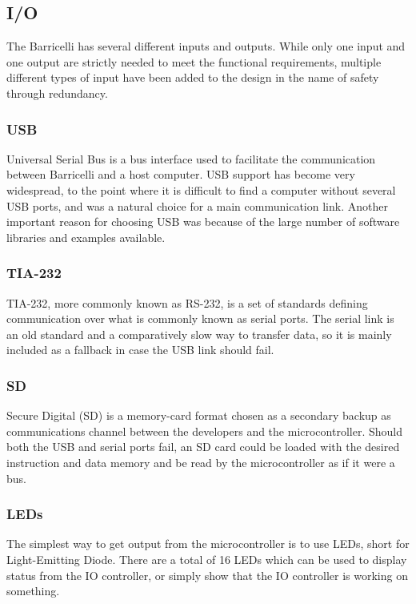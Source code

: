 \subsection{I/O}

The Barricelli has several different inputs and outputs.
While only one input and one output are strictly needed to meet the functional requirements, multiple different types of input have been added to the design in the name of safety through redundancy.

\subsubsection{USB}

Universal Serial Bus is a bus interface used to facilitate the communication between Barricelli and a host computer.
USB support has become very widespread, to the point where it is difficult to find a computer without several USB ports, and was a natural choice for a main communication link.
Another important reason for choosing USB was because of the large number of software libraries and examples available.

\subsubsection{TIA-232}

TIA-232, more commonly known as RS-232, is a set of standards defining communication over what is commonly known as serial ports.
The serial link is an old standard and a comparatively slow way to transfer data, so it is mainly included as a fallback in case the USB link should fail.

\subsubsection{SD}

Secure Digital (SD) is a memory-card format chosen as a secondary backup as communications channel between the developers and the microcontroller.
Should both the USB and serial ports fail, an SD card could be loaded with the desired instruction and data memory and be read by the microcontroller as if it were a bus.

\subsubsection{LEDs}

The simplest way to get output from the microcontroller is to use LEDs, short for Light-Emitting Diode.
There are a total of 16 LEDs which can be used to display status from the IO controller, or simply show that the IO controller is working on something.

